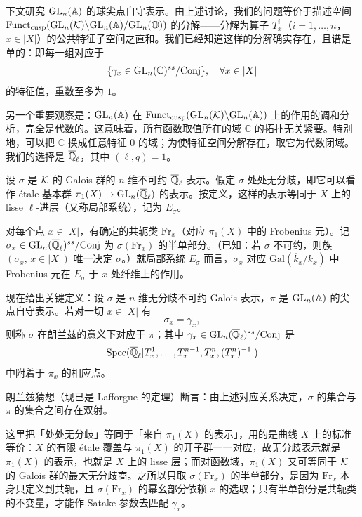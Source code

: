 下文研究 $\mathrm{GL}_n(\mathbb{A})$ 的球尖点自守表示。由上述讨论，我们的问题等价于描述空间 $\operatorname{Funct}_{\mathrm{cusp}}(\mathrm{GL}_n(\mathcal{K})\backslash\mathrm{GL}_n(\mathbb{A})/\mathrm{GL}_n(\mathbb{O}))$ 的分解——分解为算子 $T_x^i$（$i=1,\dots,n$，$x\in|X|$）的公共特征子空间之直和。我们已经知道这样的分解确实存在，且谱是单的：即每一组对应于
\[
\{\gamma_x\in\mathrm{GL}_n(\mathbb{C})^{ss}/\mathrm{Conj}\},\quad\forall x\in|X|
\]
的特征值，重数至多为 $1$。

另一个重要观察是：$\mathrm{GL}_n(\mathbb{A})$ 在 $\operatorname{Funct}_{\mathrm{cusp}}(\mathrm{GL}_n(\mathcal{K})\backslash\mathrm{GL}_n(\mathbb{A}))$ 上的作用的调和分析，完全是代数的。这意味着，所有函数取值所在的域 $\mathbb{C}$ 的拓扑无关紧要。特别地，可以把 $\mathbb{C}$ 换成任意特征 $0$ 的域；为使特征空间分解存在，取它为代数闭域。我们的选择是 $\overline{\mathbb{Q}}_\ell$，其中 $(\ell,q)=1$。

设 $\sigma$ 是 $\mathcal{K}$ 的 Galois 群的 $n$ 维不可约 $\overline{\mathbb{Q}}_\ell$-表示。假定 $\sigma$ 处处无分歧，即它可以看作 \'etale 基本群 $\pi_1(X)\to\mathrm{GL}_n(\overline{\mathbb{Q}}_\ell)$ 的表示。按定义，这样的表示等同于 $X$ 上的 lisse $\ell$-进层（又称局部系统），记为 $E_\sigma$。

对每个点 $x\in|X|$，有确定的共轭类 $\mathrm{Fr}_x$（对应 $\pi_1(X)$ 中的 Frobenius 元）。记 $\sigma_x\in\mathrm{GL}_n(\overline{\mathbb{Q}}_\ell)^{ss}/\mathrm{Conj}$ 为 $\sigma(\mathrm{Fr}_x)$ 的半单部分。（已知：若 $\sigma$ 不可约，则族 $(\sigma_x,\,x\in|X|)$ 唯一决定 $\sigma$。）就局部系统 $E_\sigma$ 而言，$\sigma_x$ 对应 $\mathrm{Gal}(\overline{k}_x/k_x)$ 中 Frobenius 元在 $E_\sigma$ 于 $x$ 处纤维上的作用。

现在给出关键定义：设 $\sigma$ 是 $n$ 维无分歧不可约 Galois 表示，$\pi$ 是 $\mathrm{GL}_n(\mathbb{A})$ 的尖点自守表示。若对一切 $x\in|X|$ 有
\[
\sigma_x=\gamma_x,
\]
则称 $\sigma$ 在朗兰兹的意义下对应于 $\pi$；其中 $\gamma_x\in\mathrm{GL}_n(\overline{\mathbb{Q}}_\ell)^{ss}/\mathrm{Conj}$ 是
\[
\operatorname{Spec}(\overline{\mathbb{Q}}_\ell[T_x^1,\dots,T_x^{n-1},T_x^n,(T_x^n)^{-1}])
\]
中附着于 $\pi_x$ 的相应点。

朗兰兹猜想（现已是 Lafforgue 的定理）断言：由上述对应关系决定，$\sigma$ 的集合与 $\pi$ 的集合之间存在双射。

\begin{annote}
这里把「处处无分歧」等同于「来自 $\pi_1(X)$ 的表示」，用的是曲线 $X$ 上的标准等价：$X$ 的有限 \'etale 覆盖与 $\pi_1(X)$ 的开子群一一对应，故无分歧表示就是 $\pi_1(X)$ 的表示，也就是 $X$ 上的 lisse 层；而对函数域，$\pi_1(X)$ 又可等同于 $\mathcal{K}$ 的 Galois 群的最大无分歧商。之所以只取 $\sigma(\mathrm{Fr}_x)$ 的半单部分，是因为 $\mathrm{Fr}_x$ 本身只定义到共轭，且 $\sigma(\mathrm{Fr}_x)$ 的幂幺部分依赖 $x$ 的选取；只有半单部分是共轭类的不变量，才能作 Satake 参数去匹配 $\gamma_x$。\par{}
\end{annote}
